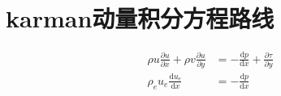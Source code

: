 \section{karman动量积分方程路线}

\begin{align}
    \rho u \frac{\partial u}{\partial x}+\rho v\frac{\partial u}{\partial y}&=-\frac{\mathrm{d}p}{\mathrm{d}x}+\frac{\partial \tau}{\partial y}\\
    \rho_{e}u_{e}\frac{\mathrm{d}u_{e}}{\mathrm{d}x}&=-\frac{\mathrm{d}p}{\mathrm{d}x}
\end{align}
